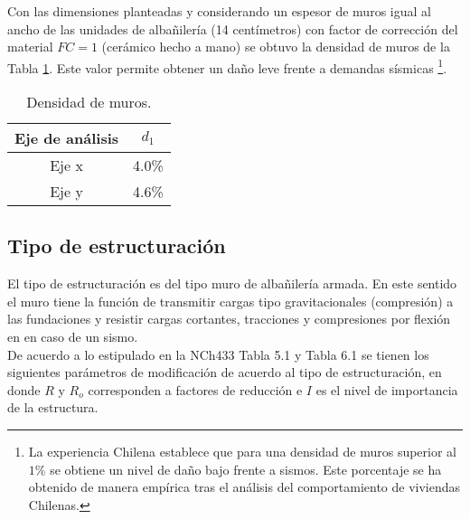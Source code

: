 \begin{table}[H]
  \centering
  \caption{Distancias alturas en cada muro.}
  \label{tab:tablaaltomuro}
\end{table}

Con las dimensiones planteadas y considerando un espesor de muros igual al ancho de las unidades de albañilería (14 centímetros) con factor de corrección del material $FC=1$ (cerámico hecho a mano) se obtuvo la densidad de muros de la Tabla \ref{tabdensidad}. Este valor permite obtener un daño leve frente a demandas sísmicas \footnote{La experiencia Chilena establece que para una densidad de muros superior al $1\%$ se obtiene un nivel de daño bajo frente a sismos. Este porcentaje se ha obtenido de manera empírica tras el análisis del comportamiento de viviendas Chilenas.}.

\begin{table}[H]
  \centering
  \caption{Densidad de muros.}
  \begin{tabular}{cc}
    \hline
    \textbf{Eje de análisis} & \boldmath{}\textbf{$d_1$}\unboldmath{} \bigstrut\\
    \hline
    Eje x & 4.0\% \bigstrut[t]\\
    Eje y & 4.6\% \bigstrut[b]\\
    \hline
  \end{tabular}
  \label{tabdensidad}
\end{table}

\subsection{Tipo de estructuración}

El tipo de estructuración es del tipo muro de albañilería armada. En este sentido el muro tiene la función de transmitir cargas tipo gravitacionales (compresión) a las fundaciones y resistir cargas cortantes, tracciones y compresiones por flexión en en caso de un sismo. \\

De acuerdo a lo estipulado en la NCh433 Tabla 5.1 y Tabla 6.1 se tienen los siguientes parámetros de modificación de acuerdo al tipo de estructuración, en donde $R$ y $R_o$ corresponden a factores de reducción e $I$ es el nivel de importancia de la estructura.

